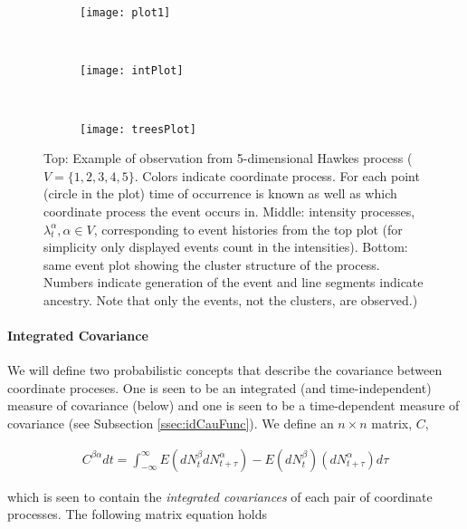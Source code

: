 \documentclass[accepted]{uai2021} %
\begin{document}
\begin{figure}
				\begin{subfigure}{0.48\linewidth}
					\centering
					\texttt{[image: plot1]}
				\end{subfigure} \\
				\begin{subfigure}{0.48\linewidth}
					\centering
					\texttt{[image: intPlot]}
				\end{subfigure} \\
				\begin{subfigure}{0.48\linewidth}
					\centering
					\texttt{[image: treesPlot]}
				\end{subfigure}
				\caption{Top: Example of observation from 5-dimensional Hawkes 
				process ($V = \{1,2,3,4,5\}$. Colors indicate coordinate 
				process. For each point 
				(circle in the plot) time of occurrence is known as well as 
				which coordinate process the event occurs in. Middle: intensity 
				processes, $\lambda_t^\alpha, \alpha\in V$, corresponding to 
				event 
				histories from the top plot (for simplicity only displayed 
				events 
				count in the intensities). Bottom: same event plot showing the 
				cluster structure of the process. Numbers indicate generation 
				of the event and line segments indicate ancestry. Note that 
				only the events, 
				not the clusters, are observed.)}
\end{figure}


\paragraph{Integrated Covariance}

We will define two probabilistic concepts that describe the covariance between 
coordinate proceses. One 
is seen to be an integrated (and time-independent) measure of covariance 
(below) and 
one is seen to be a 
time-dependent measure of covariance (see Subsection \ref{ssec:idCauFunc}). We 
define an $n\times n$ matrix, $C$,

\begin{align}
	C^{\beta\alpha} dt = \int_{-\infty}^{\infty} E(dN_t^\beta 
	dN_{t+\tau}^\alpha) - E(dN_t^\beta )(dN_{t+\tau}^\alpha) d\tau
\end{align}

which is seen to contain the \emph{integrated covariances} of each pair of 
coordinate processes. The following matrix equation holds 
\citep{jovanovic2015,	 
achab2017}
\end{document}
